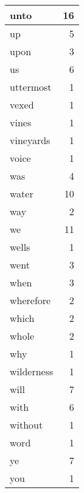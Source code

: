 \begin{center}
\begin{longtable}{l|r}
unto & 16 \\ \hline
up & 5 \\ \hline
upon & 3 \\ \hline
us & 6 \\ \hline
uttermost & 1 \\ \hline
vexed & 1 \\ \hline
vines & 1 \\ \hline
vineyards & 1 \\ \hline
voice & 1 \\ \hline
was & 4 \\ \hline
water & 10 \\ \hline
way & 2 \\ \hline
we & 11 \\ \hline
wells & 1 \\ \hline
went & 3 \\ \hline
when & 3 \\ \hline
wherefore & 2 \\ \hline
which & 2 \\ \hline
whole & 2 \\ \hline
why & 1 \\ \hline
wilderness & 1 \\ \hline
will & 7 \\ \hline
with & 6 \\ \hline
without & 1 \\ \hline
word & 1 \\ \hline
ye & 7 \\ \hline
you & 1 \\ \hline
\end{longtable}
\end{center}



\normalsize



